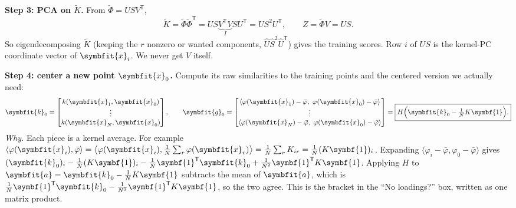 \documentclass[11pt]{article}
\newcommand{\bm}[1]{\symbfit{#1}}
\newcommand{\vx}{\bm{x}}
\newcommand{\one}{\symbf{1}}
\newcommand{\T}{^{\mathsf T}}
\begin{document}
\textbf{Step 3: PCA on $\widetilde K$.} From $\widetilde\Phi=USV\T$,
\[
\widetilde K=\widetilde\Phi\widetilde\Phi\T=US\underbrace{V\T V}_{I}SU\T=\boxed{US^2U\T},\qquad Z=\widetilde\Phi V=\boxed{US}.
\]
So eigendecomposing $\widetilde K$ (keeping the $r$ nonzero or wanted components, $\widehat U\widehat S^2\widehat U\T$) gives the training scores. Row $i$ of $US$ is the
kernel-PC coordinate vector of $\vx_i$. We never get $V$ itself.

\textbf{Step 4: center a new point $\vx_0$.} Compute its raw similarities to the training points and the centered version we
actually need:
\[
\bm k_0=\begin{bmatrix}k(\vx_1,\vx_0)\\\vdots\\k(\vx_N,\vx_0)\end{bmatrix},\qquad
\bm g_0=\begin{bmatrix}\langle\varphi(\vx_1)-\bar\varphi,\ \varphi(\vx_0)-\bar\varphi\rangle\\\vdots\\\langle\varphi(\vx_N)-\bar\varphi,\ \varphi(\vx_0)-\bar\varphi\rangle\end{bmatrix}
=\boxed{H\Big(\bm k_0-\tfrac1NK\one\Big).}
\]
\emph{Why.} Each piece is a kernel average. For example
$\langle\varphi(\vx_i),\bar\varphi\rangle=\big\langle\varphi(\vx_i),\tfrac1N\sum_r\varphi(\vx_r)\big\rangle=\tfrac1N\sum_rK_{ir}=\tfrac1N(K\one)_i$. Expanding
$\langle\varphi_i-\bar\varphi,\varphi_0-\bar\varphi\rangle$ gives
$(\bm k_0)_i-\tfrac1N(K\one)_i-\tfrac1N\one\T\bm k_0+\tfrac1{N^2}\one\T K\one$. Applying $H$ to $\bm a=\bm k_0-\tfrac1NK\one$ subtracts the mean of $\bm a$,
which is $\tfrac1N\one\T\bm k_0-\tfrac1{N^2}\one\T K\one$, so the two agree. This is the bracket in the ``No loadings?'' box, written as one matrix product.
\end{document}
